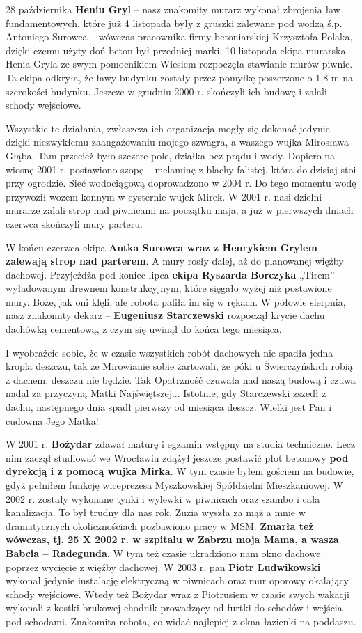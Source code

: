 28 października \textbf{Heniu Gryl} – nasz znakomity murarz wykonał zbrojenia ław fundamentowych, które już 4 listopada były z gruszki zalewane pod wodzą ś.p. Antoniego Surowca – wówczas pracownika firmy betoniarskiej Krzysztofa Polaka, dzięki czemu użyty doń beton był przedniej marki. 10 listopada ekipa murarska Henia Gryla ze swym pomocnikiem Wiesiem rozpoczęła stawianie murów piwnic. Ta ekipa odkryła, że ławy budynku zostały przez pomyłkę poszerzone o 1,8 m na szerokości budynku. Jeszcze w grudniu 2000 r. skończyli ich budowę i zalali schody wejściowe.

Wszystkie te działania, zwłaszcza ich organizacja mogły się dokonać jedynie dzięki niezwykłemu zaangażowaniu mojego szwagra, a waszego wujka Mirosława Głąba. Tam przecież było szczere pole, działka bez prądu i wody. Dopiero na wiosnę 2001 r. postawiono szopę – melaminę z blachy falistej, która do dzisiaj stoi przy ogrodzie. Sieć wodociągową doprowadzono w 2004 r. Do tego momentu wodę przywoził wozem konnym w cysternie wujek Mirek. W 2001 r. nasi dzielni murarze zalali strop nad piwnicami na początku maja, a już w pierwszych dniach czerwca skończyli mury parteru.

W końcu czerwca ekipa \textbf{Antka Surowca wraz z Henrykiem Grylem zalewają strop nad parterem}. A mury rosły dalej, aż do planowanej więźby dachowej. Przyjeżdża pod koniec lipca \textbf{ekipa Ryszarda Borczyka} „Tirem” wyładowanym drewnem konstrukcyjnym, które sięgało wyżej niż postawione mury. Boże, jak oni klęli, ale robota paliła im się w rękach. W połowie sierpnia, nasz znakomity dekarz – \textbf{Eugeniusz Starczewski} rozpoczął krycie dachu dachówką cementową, z czym się uwinął do końca tego miesiąca.

I wyobraźcie sobie, że w czasie wszystkich robót dachowych nie spadła jedna kropla deszczu, tak że Mirowianie sobie żartowali, że póki u Świerczyńskich robią z dachem, deszczu nie będzie. Tak Opatrzność czuwała nad naszą budową i czuwa nadal za przyczyną Matki Najświętszej... Istotnie, gdy Starczewski zszedł z dachu, następnego dnia spadł pierwszy od miesiąca deszcz. Wielki jest Pan i cudowna Jego Matka!

W 2001 r. \textbf{Bożydar} zdawał maturę i egzamin wstępny na studia techniczne. Lecz nim zaczął studiować we Wrocławiu zdążył jeszcze postawić płot betonowy \textbf{pod dyrekcją i z pomocą wujka Mirka}. W tym czasie byłem gościem na budowie, gdyż pełniłem funkcję wiceprezesa Myszkowskiej Spółdzielni Mieszkaniowej. W 2002 r. zostały wykonane tynki i wylewki w piwnicach oraz szambo i cała kanalizacja. To był trudny dla nas rok. Zuzia wyszła za mąż a mnie w dramatycznych okolicznościach pozbawiono pracy w MSM. \textbf{Zmarła też wówczas, tj. 25 X 2002 r. w szpitalu w Zabrzu moja Mama, a wasza Babcia – Radegunda}. W tym też czasie ukradziono nam okno dachowe poprzez wycięcie z więźby dachowej. W 2003 r. pan \textbf{Piotr Ludwikowski} wykonał jedynie instalację elektryczną w piwnicach oraz mur oporowy okalający schody wejściowe. Wtedy też Bożydar wraz z Piotrusiem w czasie swych wakacji wykonali z kostki brukowej chodnik prowadzący od furtki do schodów i wejścia pod schodami. Znakomita robota, co widać najlepiej z okna łazienki na poddaszu.

